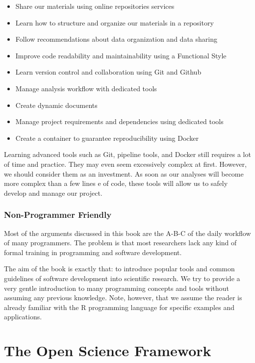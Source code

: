 \documentclass[
  11pt,
]{book}
\providecommand{\tightlist}{%
  \setlength{\itemsep}{0pt}\setlength{\parskip}{0pt}}
\begin{document}
\begin{itemize}
\tightlist
\item
  Share our materials using online repositories services
\item
  Learn how to structure and organize our materials in a repository
\item
  Follow recommendations about data organization and data sharing
\item
  Improve code readability and maintainability using a Functional Style
\item
  Learn version control and collaboration using Git and Github
\item
  Manage analysis workflow with dedicated tools
\item
  Create dynamic documents
\item
  Manage project requirements and dependencies using dedicated tools
\item
  Create a container to guarantee reproducibility using Docker
\end{itemize}

Learning advanced tools such as Git, pipeline tools, and Docker still requires a lot of time and practice. They may even seem excessively complex at first. However, we should consider them as an investment. As soon as our analyses will become more complex than a few lines e of code, these tools will allow us to safely develop and manage our project.

\hypertarget{non-programmer-friendly}{%
\subsection{Non-Programmer Friendly}\label{non-programmer-friendly}}

Most of the arguments discussed in this book are the A-B-C of the daily workflow of many programmers. The problem is that most researchers lack any kind of formal training in programming and software development.

The aim of the book is exactly that: to introduce popular tools and common guidelines of software development into scientific research. We try to provide a very gentle introduction to many programming concepts and tools without assuming any previous knowledge. Note, however, that we assume the reader is already familiar with the R programming language for specific examples and applications.

\hypertarget{osf-chapter}{%
\chapter{The Open Science Framework}\label{osf-chapter}}
\end{document}
